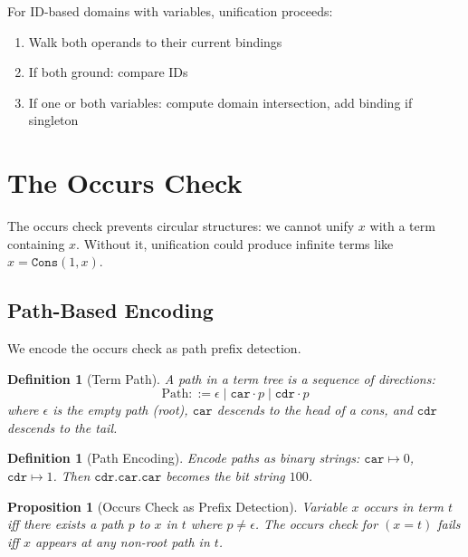 \documentclass[11pt,a4paper]{article}
\newtheorem{definition}[theorem]{Definition}
\newtheorem{proposition}[theorem]{Proposition}
\begin{document}
For ID-based domains with variables, unification proceeds:
\begin{enumerate}
  \item Walk both operands to their current bindings
  \item If both ground: compare IDs
  \item If one or both variables: compute domain intersection, add binding if singleton
\end{enumerate}

\section{The Occurs Check}
\label{sec:occurs_check_chirho}

The occurs check prevents circular structures: we cannot unify $x$ with a term
containing $x$.
Without it, unification could produce infinite terms like $x = \texttt{Cons}(1, x)$.

\subsection{Path-Based Encoding}

We encode the occurs check as path prefix detection.

\begin{definition}[Term Path]
\label{def:term_path_chirho}
A \emph{path} in a term tree is a sequence of directions:
\[
\text{Path} ::= \epsilon \mid \texttt{car} \cdot p \mid \texttt{cdr} \cdot p
\]
where $\epsilon$ is the empty path (root), $\texttt{car}$ descends to the head of a cons,
and $\texttt{cdr}$ descends to the tail.
\end{definition}

\begin{definition}[Path Encoding]
\label{def:path_encoding_chirho}
Encode paths as binary strings: $\texttt{car} \mapsto 0$, $\texttt{cdr} \mapsto 1$.
Then $\texttt{cdr.car.car}$ becomes the bit string $100$.
\end{definition}

\begin{proposition}[Occurs Check as Prefix Detection]
\label{prop:occurs_prefix_chirho}
Variable $x$ occurs in term $t$ iff there exists a path $p$ to $x$ in $t$
where $p \neq \epsilon$.
The occurs check for $(x = t)$ fails iff $x$ appears at any non-root path in $t$.
\end{proposition}
\end{document}
